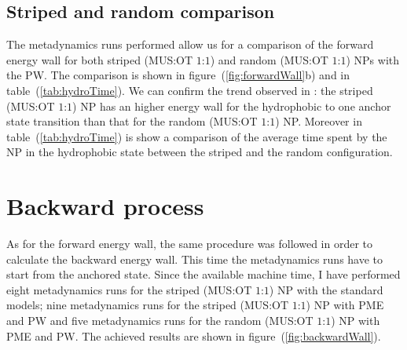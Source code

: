 \subsection{Striped and random comparison}
The metadynamics runs performed allow us for a comparison of the forward energy wall for both striped (\ac{MUS}:\ac{OT} $1$:$1$) and random (\ac{MUS}:\ac{OT} $1$:$1$) \acp{NP} with the \ac{PW}. The comparison is shown in figure~(\ref{fig:forwardWall}b) and in table~(\ref{tab:hydroTime}). We can confirm the trend observed in \cite{ourPaper}: the striped (\ac{MUS}:\ac{OT} $1$:$1$) \ac{NP} has an higher energy wall for the hydrophobic to one anchor state transition than that for the random (\ac{MUS}:\ac{OT} $1$:$1$) \ac{NP}. Moreover in table~(\ref{tab:hydroTime}) is show a comparison of the average time spent by the \ac{NP} in the hydrophobic state between the striped and the random configuration.

 
\section{Backward process}
As for the forward energy wall, the same procedure was followed in order to calculate the backward energy wall. This time the metadynamics runs have to start from the anchored state. Since the available machine time, I have performed eight metadynamics runs for the striped (\ac{MUS}:\ac{OT} $1$:$1$) \ac{NP} with the standard \martini models; nine metadynamics runs for the striped (\ac{MUS}:\ac{OT} $1$:$1$) \ac{NP} with \ac{PME} and \ac{PW} and five metadynamics runs for the random (\ac{MUS}:\ac{OT} $1$:$1$) \ac{NP} with \ac{PME} and \ac{PW}. The achieved results are shown in figure~(\ref{fig:backwardWall}).

